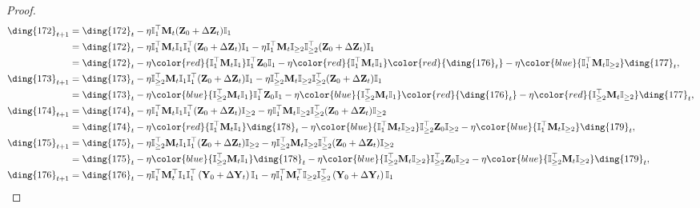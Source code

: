 \documentclass{article}
\theoremstyle{plain}
\theoremstyle{remark}
\def\bY{\mathbf{Y}}
\def\bZ{\mathbf{Z}}
\newcommand{\cc}[1]{\text{\ding{\number\numexpr#1 + 171\relax}}}
\newcommand{\cbb}[1]{\noindent{\color{blue}{#1}}}  %
\newcommand{\crr}[1]{\noindent{\color{red}{#1}}}  %
\begin{document}
\begin{proof}
    \begin{align}
        \cc{1}_{t+1} &= \cc{1}_t-\eta\mathbb{I}_1^\top\mathbf{M}_t(\bZ_0+\Delta\bZ_t)\mathbb{I}_1 \\
        &= \cc{1}_t-\eta\mathbb{I}_1^\top\mathbf{M}_t\mathbb{I}_1\mathbb{I}_1^\top(\bZ_0+\Delta\bZ_t)\mathbb{I}_1-\eta\mathbb{I}_1^\top\mathbf{M}_t\mathbb{I}_{\ge2}\mathbb{I}_{\ge2}^\top(\bZ_0+\Delta\bZ_t)\mathbb{I}_1 \\
        &= \cc{1}_t-\eta\crr{\mathbb{I}_1^\top\mathbf{M}_t\mathbb{I}_1}\mathbb{I}_1^\top \bZ_0\mathbb{I}_1 - \eta\crr{\mathbb{I}_1^\top\mathbf{M}_t\mathbb{I}_1}\crr{\cc{5}_t}- \eta\cbb{\mathbb{I}_1^\top\mathbf{M}_t\mathbb{I}_{\ge2}}\cc{6}_t,
        \\
        \cc{2}_{t+1} &= \cc{2}_t-\eta\mathbb{I}_{\ge 2}^\top\mathbf{M}_t\mathbb{I}_1\mathbb{I}_1^\top(\bZ_0+\Delta\bZ_t)\mathbb{I}_1 -\eta\mathbb{I}_{\ge 2}^\top\mathbf{M}_t\mathbb{I}_{\ge2}\mathbb{I}_{\ge2}^\top(\bZ_0+\Delta\bZ_t)\mathbb{I}_1 \\
        &= \cc{2}_t-\eta\cbb{\mathbb{I}_{\ge 2}^\top\mathbf{M}_t\mathbb{I}_1}\mathbb{I}_1^\top\bZ_0\mathbb{I}_1 -\eta\cbb{\mathbb{I}_{\ge 2}^\top\mathbf{M}_t\mathbb{I}_1}\crr{\cc{5}_t} -\eta\crr{\mathbb{I}_{\ge 2}^\top\mathbf{M}_t\mathbb{I}_{\ge2}}\cc{6}_t,
        \\
        \cc{3}_{t+1} &= \cc{3}_t-\eta\mathbb{I}_{1}^\top\mathbf{M}_t\mathbb{I}_1\mathbb{I}_1^\top(\bZ_0+\Delta\bZ_t)\mathbb{I}_{\ge 2}-\eta\mathbb{I}_{1}^\top\mathbf{M}_t\mathbb{I}_{\ge2}\mathbb{I}_{\ge2}^\top(\bZ_0+\Delta\bZ_t)\mathbb{I}_{\ge 2} \\
        &= \cc{3}_t-\eta\crr{\mathbb{I}_{1}^\top\mathbf{M}_t\mathbb{I}_1}\cc{7}_t-\eta\cbb{\mathbb{I}_{1}^\top\mathbf{M}_t\mathbb{I}_{\ge2}}\mathbb{I}_{\ge2}^\top\bZ_0\mathbb{I}_{\ge2}-\eta\cbb{\mathbb{I}_{1}^\top\mathbf{M}_t\mathbb{I}_{\ge2}}\cc{8}_t,
        \\
        \cc{4}_{t+1} &= \cc{4}_t-\eta\mathbb{I}_{\ge 2}^\top\mathbf{M}_t\mathbb{I}_1\mathbb{I}_1^\top(\bZ_0+\Delta\bZ_t)\mathbb{I}_{\ge 2}-\eta\mathbb{I}_{\ge 2}^\top\mathbf{M}_t\mathbb{I}_{\ge2}\mathbb{I}_{\ge2}^\top(\bZ_0+\Delta\bZ_t)\mathbb{I}_{\ge 2} \\
        &= \cc{4}_t-\eta\cbb{\mathbb{I}_{\ge 2}^\top\mathbf{M}_t\mathbb{I}_1}\cc{7}_t-\eta\cbb{\mathbb{I}_{\ge 2}^\top\mathbf{M}_t\mathbb{I}_{\ge2}}\mathbb{I}_{\ge2}^\top\bZ_0\mathbb{I}_{\ge 2} - \eta\cbb{\mathbb{I}_{\ge 2}^\top\mathbf{M}_t\mathbb{I}_{\ge2}}\cc{8}_t,
        \\
        \cc{5}_{t+1} &= \cc{5}_t-\eta\mathbb{I}_1^\top\mathbf{M}_t^\top\mathbb{I}_1\mathbb{I}_1^\top\left(\bY_0+\Delta\bY_t\right)\mathbb{I}_1-\eta\mathbb{I}_1^\top\mathbf{M}_t^\top\mathbb{I}_{\ge2}\mathbb{I}_{\ge2}^\top\left(\bY_0+\Delta\bY_t\right)\mathbb{I}_1 \\

\end{align}
\end{proof}
\end{document}
